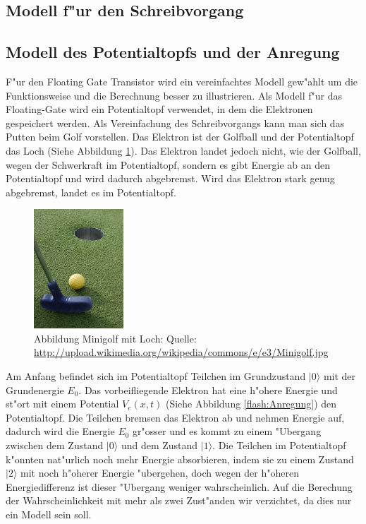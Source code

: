 \begin{refsection}
\section{Modell f"ur den Schreibvorgang}
\subsection{Modell des Potentialtopfs und der Anregung}
F"ur den Floating Gate Transistor wird ein vereinfachtes Modell
gew"ahlt um die Funktionsweise und die Berechnung besser zu illustrieren.
Als Modell f"ur das Floating-Gate wird ein Potentialtopf verwendet,
in dem die Elektronen gespeichert werden.
Als Vereinfachung des Schreibvorgangs kann man sich das Putten beim
Golf vorstellen.
Das Elektron ist der Golfball und der Potentialtopf das Loch (Siehe Abbildung \ref{skript:Minigolf}).
Das Elektron landet jedoch nicht, wie der Golfball, wegen der Schwerkraft
im Potentialtopf, sondern es gibt Energie ab an den Potentialtopf und
wird dadurch abgebremst.
Wird das Elektron stark genug abgebremst, landet es im Potentialtopf.

\begin{figure}
\centering
\includegraphics[width=0.3\textwidth]{flash/graphics/Minigolf.jpg}
\caption{Abbildung Minigolf mit Loch: Quelle:
\url{http://upload.wikimedia.org/wikipedia/commons/e/e3/Minigolf.jpg}
\label{skript:Minigolf}}
\end{figure}

Am Anfang befindet sich im Potentialtopf Teilchen im Grundzustand $|0\rangle$
mit der Grundenergie $E_{0}$.
Das vorbeifliegende Elektron hat eine h"ohere Energie und st"ort mit
einem Potential $V_{e}(x,t)$ (Siehe Abbildung \ref{flash:Anregung})
den Potentialtopf.
Die Teilchen bremsen das Elektron ab und nehmen Energie auf, dadurch
wird die Energie $E_{0}$ gr"osser und es kommt zu einem "Ubergang 
zwischen dem Zustand $|0\rangle$ und dem Zustand $|1\rangle$.
Die Teilchen im Potentialtopf k"onnten nat"urlich noch mehr Energie
absorbieren, indem sie zu einem Zustand $|2\rangle$ mit noch h"oherer
Energie "ubergehen, doch wegen der h"oheren Energiedifferenz ist dieser
"Ubergang weniger wahrscheinlich.
Auf die Berechung der Wahrscheinlichkeit mit mehr als zwei Zust"anden
wir verzichtet, da dies nur ein Modell sein soll.


\end{refsection}
